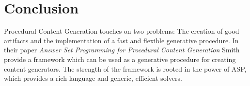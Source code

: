 \documentclass[runningheads]{llncs}
\newcommand{\papertitle}{Answer Set Programming for Procedural Content Generation}
\newcommand{\authorquote}{Smith \etal}
\begin{document}
\section{Conclusion} \label{sec:conclusion}

Procedural Content Generation touches on two problems: The creation of good artifacts and the implementation of a fast and flexible generative procedure. In their paper \textit{\papertitle} \authorquote{} provide a framework which can be used as a generative procedure for creating content generators. The strength of the framework is rooted in the power of ASP, which provides a rich language and generic, efficient solvers. 






\end{document}
